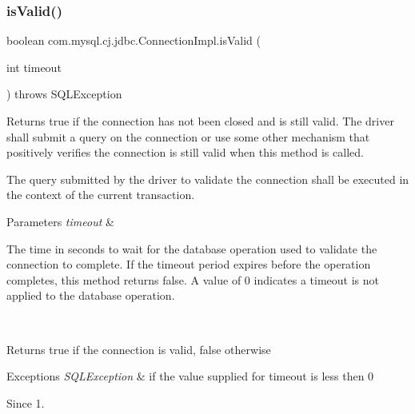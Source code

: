 \subsubsection{\texorpdfstring{is\+Valid()}{isValid()}}
{\footnotesize\ttfamily boolean com.\+mysql.\+cj.\+jdbc.\+Connection\+Impl.\+is\+Valid (\begin{DoxyParamCaption}\item[{int}]{timeout }\end{DoxyParamCaption}) throws S\+Q\+L\+Exception}

Returns true if the connection has not been closed and is still valid. The driver shall submit a query on the connection or use some other mechanism that positively verifies the connection is still valid when this method is called. 

The query submitted by the driver to validate the connection shall be executed in the context of the current transaction.


\begin{DoxyParams}{Parameters}
{\em timeout} & 
\begin{DoxyItemize}
\item The time in seconds to wait for the database operation used to validate the connection to complete. If the timeout period expires before the operation completes, this method returns false. A value of 0 indicates a timeout is not applied to the database operation. 
\end{DoxyItemize}\\
\hline
\end{DoxyParams}
\begin{DoxyReturn}{Returns}
true if the connection is valid, false otherwise 
\end{DoxyReturn}

\begin{DoxyExceptions}{Exceptions}
{\em S\+Q\+L\+Exception} & if the value supplied for {\ttfamily timeout} is less then 0 \\
\hline
\end{DoxyExceptions}
\begin{DoxySince}{Since}
1. 
\end{DoxySince}
\mbox{\label{classcom_1_1mysql_1_1cj_1_1jdbc_1_1_connection_impl_a81fc1065c0ebf1f56f7c8d1f60d4333f}} 
